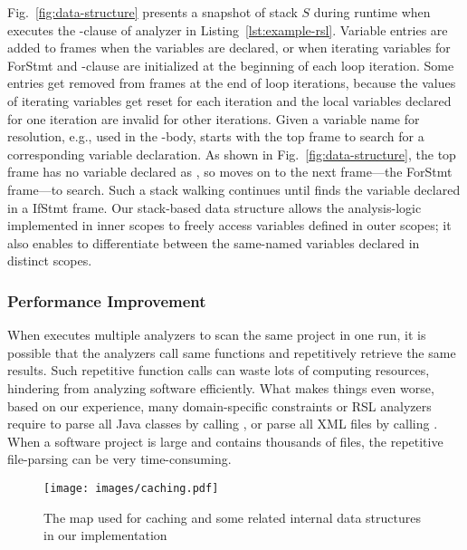 Fig.~\ref{fig:data-structure} presents a snapshot of stack $S$ during runtime  when \tool executes the -clause of analyzer in Listing~\ref{lst:example-rsl}. Variable entries are added to frames when the variables are declared, or when iterating variables for ForStmt and -clause are initialized at the beginning of each loop iteration. Some entries get removed from frames at the end of loop iterations, because the values of iterating variables get reset for each iteration and the local variables declared for one iteration are invalid for other iterations. 
Given a variable name for resolution, e.g.,  used in the -body, \tool starts with the top frame to search for a corresponding variable declaration. As shown in Fig.~\ref{fig:data-structure}, the top frame has no variable declared as , so \tool moves on to the next frame---the {ForStmt} frame---to search. Such a stack walking continues until \tool finds the variable declared in a {IfStmt} frame. 
Our stack-based data structure allows the analysis-logic implemented in inner scopes to freely access variables defined in outer scopes; it also enables \tool to differentiate between the same-named variables declared in distinct scopes. 

  \vspace{-.5em}
\subsubsection{Performance Improvement}
\label{sec:cache}

When \tool executes multiple analyzers to scan the same project in one run, it is possible that the analyzers call same functions and repetitively retrieve the same results. 
Such repetitive function calls can waste lots of computing resources, hindering \tool from analyzing software efficiently. 
What makes things even worse, based on our experience, many domain-specific constraints or RSL analyzers
require \tool to parse all Java classes by calling , or parse all XML files by calling . When a software project is large and contains thousands of files, the repetitive file-parsing can be very time-consuming. 

\begin{figure}
    \centering
    \texttt{[image: images/caching.pdf]}
      \vspace{-1.2em}
    \caption{The map used for caching and some related internal data structures in our implementation}
    \label{fig:cache}  \vspace{-1.5em}
\end{figure}

